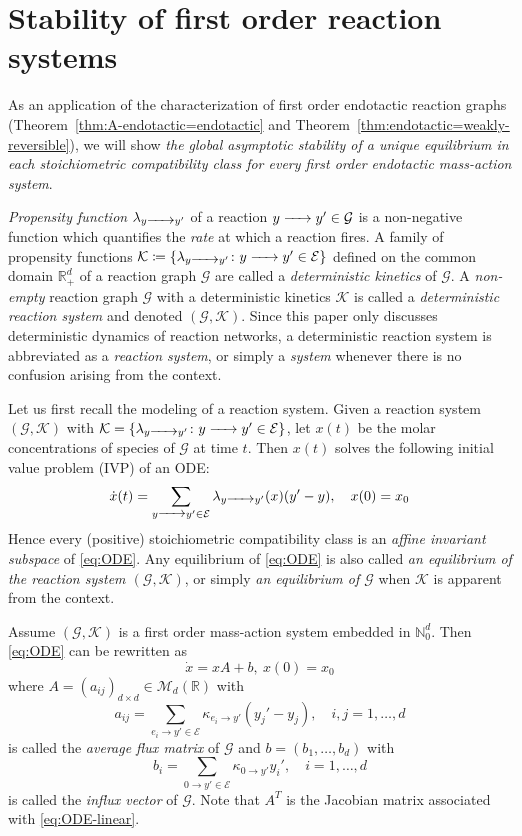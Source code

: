 \documentclass[10pt]{amsart}
\numberwithin{equation}{section}
\theoremstyle{plain}
\theoremstyle{definition}
\theoremstyle{remark}
\newcommand{\cG}{\mathcal{G}}
\newcommand{\cK}{\mathcal{K}}
\begin{document}
\section{Stability of first order reaction systems}\label{sect:stability}


{As an application of the characterization of first order endotactic reaction graphs (Theorem~\ref{thm:A-endotactic=endotactic} and Theorem~\ref{thm:endotactic=weakly-reversible})}, we will show \emph{the global asymptotic stability of a unique equilibrium in each stoichiometric compatibility class for every first order endotactic mass-action system}.

\emph{Propensity function} $\lambda_{y\ce{->[]} y'}$ of a reaction $y\ce{->[]} y'\in\mathcal{G}$ is a non-negative function which quantifies the \emph{rate} at which a reaction fires. A family of propensity functions $\mathcal{K}\coloneqq\{\lambda_{y\ce{->[]} y'}\colon y\ce{->[]} y'\in\mathcal{E}\}$ defined on the common  domain $\mathbb{R}^d_+$ of a reaction graph $\mathcal{G}$ are called a \emph{deterministic kinetics} of $\mathcal{G}$. A \emph{non-empty} reaction graph $\cG$  with a deterministic kinetics $\mathcal{K}$ is  called a \emph{deterministic reaction system} and denoted $(\mathcal{G},\mathcal{K})$.  Since this paper only discusses deterministic dynamics of reaction networks, a deterministic reaction system is abbreviated as a \emph{reaction system}, or simply a \emph{system} whenever there is no confusion arising from the context.





Let us first recall the modeling of a reaction system. Given a reaction system $(\cG,\mathcal{K})$ with $\mathcal{K}=\{\lambda_{y\ce{->} y'}\colon y\ce{->} y'\in\mathcal{E}\}$, let $x(t)$ be the molar concentrations of species of $\cG$ at time $t$.  Then $x(t)$ solves the following  initial value problem (IVP) of an ODE:
\begin{equation}\label{eq:ODE}
\dot{x}(t) = \sum_{y\ce{->} y'\in\mathcal{E}}\lambda_{y\ce{->} y'}(x)(y'-y),\quad x(0)=x_0
\end{equation}
Hence every (positive) stoichiometric compatibility class is  an \emph{affine invariant subspace} of \eqref{eq:ODE}. Any equilibrium of \eqref{eq:ODE} is also called \emph{an equilibrium of the reaction system $(\cG,\mathcal{K})$}, or simply \emph{an equilibrium of $\cG$} when $\cK$ is apparent from the context.

Assume $(\cG,\mathcal{K})$ is a first order mass-action system embedded in $\mathbb{N}^d_0$. Then \eqref{eq:ODE} can be rewritten as
\begin{equation}\label{eq:ODE-linear}
\dot{x}=xA+b,\ x(0)=x_0
\end{equation}
where $A=(a_{ij})_{d\times d}\in\mathcal{M}_d(\mathbb{R})$ with $$a_{ij}=\sum_{e_i\to y'\in\mathcal{E}}\kappa_{e_i\to y'}(y_j'-y_j),\quad i,j=1,\ldots,d$$is called the \emph{average flux matrix} of $\cG$
and $b=(b_1,\ldots,b_d)$ with
\[b_i=\sum_{0\to y'\in\mathcal{E}}\kappa_{0\to y'}y_i',\quad i=1,\ldots,d\] is called the \emph{influx vector} of $\cG$. Note that $A^T$ is the Jacobian matrix associated with  \eqref{eq:ODE-linear}.
\end{document}
